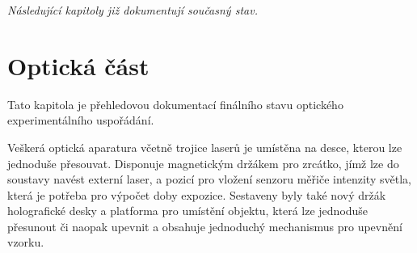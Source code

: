 \documentclass[twoside,project]{../MFFPrace}
\begin{document}
\vfill
\noindent
\textit{Následující kapitoly již dokumentují současný stav.}
\chapter{Optická část\label{cpt:optika}}
\begin{center}
    Tato kapitola je přehledovou dokumentací finálního stavu optického experimentálního uspořádání.

    Veškerá optická aparatura včetně trojice laserů je umístěna na desce, kterou lze jednoduše přesouvat. Disponuje magnetickým držákem pro zrcátko, jímž lze do soustavy navést externí laser, a pozicí pro vložení senzoru měřiče intenzity světla, která je potřeba pro výpočet doby expozice. Sestaveny byly také nový držák holografické desky a platforma pro umístění objektu, která lze jednoduše přesunout či naopak upevnit a obsahuje jednoduchý mechanismus pro upevnění vzorku.
\end{center}
\end{document}
